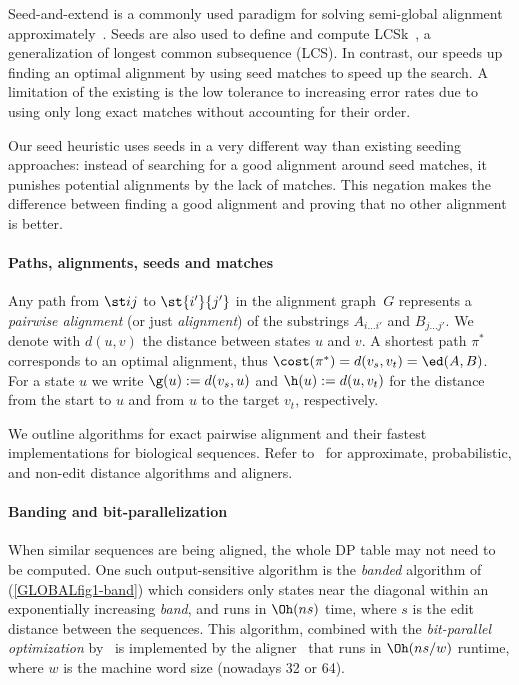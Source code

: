 %

Seed-and-extend is a commonly used paradigm for solving semi-global alignment
approximately~\citep{kucherov2019evolution}. Seeds are also used to define and
compute LCSk~\citep{benson2014longest}, a generalization of longest common
subsequence (LCS). In contrast, our \emph{\sh} speeds up finding an optimal
alignment by using seed matches to speed up the \A search. A limitation of the
existing \sh is the low tolerance to increasing error rates due to using only
long exact matches without accounting for their order.

Our seed heuristic uses seeds in a very different way than existing seeding
approaches: instead of searching for a good alignment around seed matches, it
punishes potential alignments by the lack of matches. This negation makes the
difference between finding a good alignment and proving that no other alignment
is better.

\paragraph{Paths, alignments, seeds and matches}
Any path from $\st ij$ to $\st{i'}{j'}$ in the alignment graph~$G$ represents a
\emph{pairwise alignment} (or just \emph{alignment}) of the substrings $A_{i
\dots i'}$ and $B_{j \dots j'}$. We denote with $d(u,v)$ the distance between
states $u$ and $v$. A shortest path $\pi^*$ corresponds to an optimal alignment,
thus $\cost(\pi^*) = d(v_s, v_t) = \ed(A, B)$. For a state $u$ we write $\g(u)
:= d(v_s, u)$ and $\h(u) := d(u, v_t)$ for the distance from the start to $u$
and from $u$ to the target $v_t$, respectively.

We outline algorithms for exact pairwise alignment and their fastest implementations for
biological sequences. Refer to~\citet{kucherov2019evolution} for approximate,
probabilistic, and non-edit distance algorithms and aligners.

\paragraph{Banding and bit-parallelization} When similar sequences are being
aligned, the whole DP table may not need to be computed. One such
output-sensitive algorithm is the \emph{banded} algorithm of
\citet{ukkonen1985algorithms} (\cref{GLOBALfig1-band}) which considers only states
near the diagonal within an exponentially increasing \emph{band}, and runs in
$\Oh(ns)$ time, where $s$ is the edit distance between the sequences. This
algorithm, combined with the \emph{bit-parallel optimization}
by~\citet{myers1999fast} is implemented by the \edlib
aligner~\citep{vsovsic2017edlib} that runs in $\Oh(ns/w)$ runtime, where $w$ is
the machine word size (nowadays 32 or 64).

